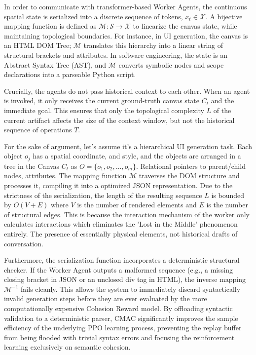 \documentclass[pdflatex,sn-mathphys-num]{sn-jnl}
\begin{document}
In order to communicate with transformer-based Worker Agents, the continuous spatial state is serialized into a discrete sequence of tokens, $x_t \in \mathcal{X}$. A bijective mapping function is defined as $\mathcal{M}: \mathcal{S} \rightarrow \mathcal{X}$ to linearize the canvas state, while maintaining topological boundaries. For instance, in UI generation, the canvas is an HTML DOM Tree; $\mathcal{M}$ translates this hierarchy into a linear string of structural brackets and attributes. In software engineering, the state is an Abstract Syntax Tree (AST), and $\mathcal{M}$ converts symbolic nodes and scope declarations into a parseable Python script.

Crucially, the agents do not pass historical context to each other. When an agent is invoked, it only receives the current ground-truth canvas state $C_t$ and the immediate goal. This ensures that only the topological complexity $L$ of the current artifact affects the size of the context window, but not the historical sequence of operations $T$.

For the sake of argument, let's assume it's a hierarchical UI generation task. Each object $o_j$ has a spatial coordinate, and style, and the objects are arranged in a tree in the Canvas $C_t$ as $O = \{o_1, o_2, \dots, o_m\}$. Relational pointers to parent/child nodes, attributes. The mapping function $\mathcal{M}$ traverses the DOM structure and processes it, compiling it into a optimized JSON representation. Due to the strictness of the serialization, the length of the resulting sequence $L$ is bounded by $O(V + E)$ where $V$ is the number of rendered elements and $E$ is the number of structural edges. This is because the interaction mechanism of the worker only calculates interactions which eliminates the 'Lost in the Middle' phenomenon entirely. The presence of essentially physical elements, not historical drafts of conversation.

Furthermore, the serialization function incorporates a deterministic structural checker. If the Worker Agent outputs a malformed sequence (e.g., a missing closing bracket in JSON or an unclosed div tag in HTML), the inverse mapping $\mathcal{M}^{-1}$ fails cleanly. This allows the system to immediately discard syntactically invalid generation steps before they are ever evaluated by the more computationally expensive Cohesion Reward model. By offloading syntactic validation to a deterministic parser, CMAC significantly improves the sample efficiency of the underlying PPO learning process, preventing the replay buffer from being flooded with trivial syntax errors and focusing the reinforcement learning exclusively on semantic cohesion.
\end{document}
